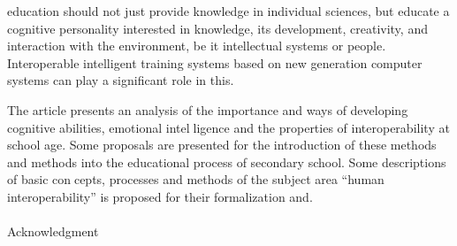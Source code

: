 \documentclass[10pt, a4paper]{article}
\begin{document}
\begin{multicols}{2}
\noindent education should not just provide knowledge in individual
sciences, but educate a cognitive personality interested
in knowledge, its development, creativity, and interaction
with the environment, be it intellectual systems or people.
Interoperable intelligent training systems based on new
generation computer systems can play a significant role
in this.

The article presents an analysis of the importance and
ways of developing cognitive abilities, emotional intelligence and the properties of interoperability at school
age. Some proposals are presented for the introduction of
these methods and methods into the educational process
of secondary school. Some descriptions of basic concepts, processes and methods of the subject area “human
interoperability” is proposed for their formalization and.

\begin{center} 
\paragraph{}
Acknowledgment
\end{center}

\end{multicols}
\end{document}
